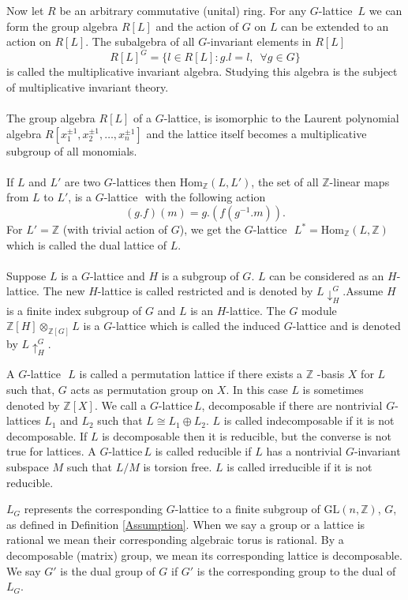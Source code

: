 \documentclass[12pt]{article}
\theoremstyle{plain}
\theoremstyle{definition}
\newcommand{\Z}{\ensuremath{\mathbb{Z}}}
\newcommand{\G}{G}
\newcommand{\glat}{$G$-lattice}
\begin{document}
Now let $R$ be an arbitrary commutative (unital) ring. For any \glat  \, $L$ we can form the group algebra $R[L]$ and the action of $G$ on $L$ can be extended to an action on $R[L]$. The subalgebra of all $G$-invariant elements in $R[L]$ $$ R[L]^ \G = \lbrace l \in R[L] : g.l = l, \,\,\, \forall g \in \G \rbrace$$ is called the multiplicative invariant algebra. Studying this algebra is the subject of multiplicative invariant theory. 
\\
\\
The group algebra $R[L]$ of a \glat , is isomorphic to the Laurent polynomial algebra \linebreak $R[x_1^{\pm 1}, x_2^{\pm 1}, \ldots , x_n^{\pm 1}] $ and the lattice itself becomes a multiplicative subgroup of all monomials.
\\
\\
If $L$ and $L'$ are two \glat  s then $\mathrm{Hom}_{\Z}(L,L')$, the set of all $\Z$-linear maps from $L$ to $L'$, is a \glat \,\, with the following action $$ (g.f)(m) = g.(f(g^{-1}.m)).$$
For $L'=\Z$ (with trivial action of $G$), we get the \glat \,\,  $L^* = \mathrm{Hom}_{\Z}(L,\Z)$ which is called the dual lattice of $L$.\\
\\Suppose $L$ is a $G$-lattice and $H$ is a subgroup of $G$. $L$ can be considered as an $H$-lattice. The new $H$-lattice is called restricted and is denoted by $L\downarrow^G_H$.Assume $H$ is a finite index subgroup of $G$ and $L$ is an $H$-lattice. The $G$ module $\Z[H] \otimes_{\Z[G]} L$ is a $G$-lattice which is called the induced $G$-lattice and is denoted by $L\uparrow_H^G$. 

A \glat \,\, $L$ is called a permutation lattice if there exists a $\Z$ -basis $X$ for $L$ such that, $G$ acts as permutation group on $X$. In this case $L$ is sometimes denoted by $\Z[X]$.
We call a \glat \,$L$, decomposable if there are nontrivial \glat s $L_1$ and $ L_2$ such that $ L\cong L_1 \oplus L_2$. $L$ is called indecomposable if it is not decomposable.
If $L$ is decomposable then it is reducible, but the converse is not true for lattices.
A \glat \,$L$ is called reducible if $L$ has a nontrivial $G$-invariant subspace $M$ such that $L/M$ is torsion free. $L$ is called irreducible if it is not reducible. 

$L_G$ represents the corresponding $G$-lattice 
to a finite subgroup of $\mathrm{GL}(n,\Z)$, $G$, as defined in Definition 
\ref{Assumption}. When we say a group or a lattice is rational we mean their 
corresponding algebraic torus is rational. By a decomposable (matrix) group, 
we mean its corresponding lattice is decomposable. We say $G'$ is the dual 
group of $G$ if $G'$ is the corresponding group to the dual of $L_G$.  
\end{document}
